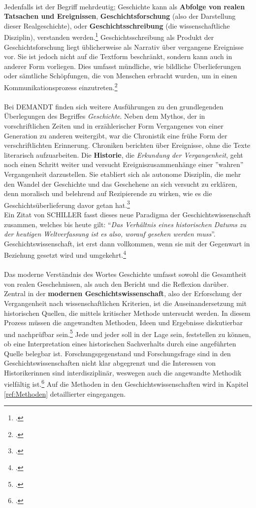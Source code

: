 \documentclass[12pt,a4paper]{article}
\begin{document}
\\
Jedenfalls ist der Begriff mehrdeutig; Geschichte kann als \textbf{Abfolge von realen Tatsachen und Ereignissen}, \textbf{Geschichtsforschung} (also der Darstellung dieser Realgeschichte), oder \textbf{Geschichtsschreibung} (die wissenschaftliche Disziplin), verstanden werden.\footcite[][S.1]{Gabriel2013fakten} Geschichtsschreibung als Produkt der Geschichtsforschung liegt üblicherweise als Narrativ über vergangene Ereignisse vor. Sie ist jedoch nicht auf die Textform beschränkt, sondern kann auch in anderer Form vorliegen. Dies umfasst mündliche, wie bildliche Überlieferungen oder sämtliche Schöpfungen, die von Menschen erbracht wurden, um in einen Kommunikationsprozess einzutreten.\footcite[][S.5-7]{frank2018visualisierungswerkzeuge}
\\
\\
Bei DEMANDT finden sich weitere Ausführungen zu den grundlegenden Überlegungen des Begriffes \textit{Geschichte}. Neben dem Mythos, der in vorschriftlichen Zeiten und in erzählerischer Form Vergangenes von einer Generation zu anderen weitergibt, war die Chronistik eine frühe Form der verschriftlichten Erinnerung. Chroniken berichten über Ereignisse, ohne die Texte literarisch aufzuarbeiten. Die \textbf{Historie}, die \textit{Erkundung der Vergangenheit}, geht noch einen Schritt weiter und versucht Ereigniszusammenhänge einer ''wahren'' Vergangenheit darzustellen. Sie etabliert sich als autonome Disziplin, die mehr den Wandel der Geschichte und das Geschehene an sich versucht zu erklären, denn moralisch und belehrend auf Rezipierende zu wirken, wie es die Geschichtsüberlieferung davor getan hat.\footcite[][S.24]{hardtwig1990geschichtskultur}
\\
Ein Zitat von SCHILLER fasst dieses neue Paradigma der Geschichtswissenschaft zusammen, welches bis heute gilt: “\textit{Das Verhältnis eines historischen Datums zu der heutigen Weltverfassung ist es also, worauf gesehen werden muss}”. Geschichtswissenschaft, ist erst dann vollkommen, wenn sie mit der Gegenwart in Beziehung gesetzt wird und umgekehrt.\footcite[][S.25]{hardtwig1990geschichtskultur}
\\
\\
Das moderne Verständnis des Wortes Geschichte umfasst sowohl die Gesamtheit von realen Geschehnissen, als auch den Bericht und die Reflexion darüber. Zentral in der \textbf{modernen Geschichtswissenschaft}, also der Erforschung der Vergangenheit nach wissenschaftlichen Kriterien, ist die Auseinandersetzung mit historischen Quellen, die mittels kritischer Methode untersucht werden. In diesem Prozess müssen die angewandten Methoden, Ideen und Ergebnisse diskutierbar und nachprüfbar sein.\footcite[][S.13-32]{demand2011philosophie} Jede und jeder soll in der Lage sein, feststellen zu können, ob eine Interpretation eines historischen Sachverhalts durch eine angeführten Quelle belegbar ist. Forschungsgegenstand und Forschungsfrage sind in den Geschichtswissenschaften nicht klar abgegrenzt und die Interessen von Historikerinnen sind interdisziplinär, weswegen auch die angewandte Methodik vielfältig ist.\footcite[][S.13]{reiche2014verfahren} Auf die Methoden in den Geschichtswissenschaften wird in Kapitel \ref{ref:Methoden} detaillierter eingegangen.
\end{document}
